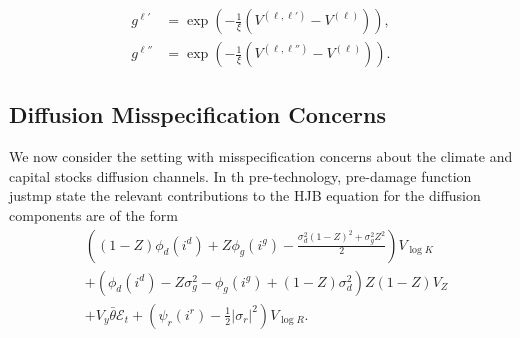 \documentclass[12pt]{article}
\begin{document}
\begin{appendices}
\vspace{-0.75cm}

\begin{eqnarray*} 
g^{\ell'} & = \exp \left(- \frac{1}{\xi} (V^{(\ell,\ell')}-V^{(\ell)}) \right), \\
g^{\ell''} & = \exp \left(- \frac{1}{\xi} (V^{(\ell,\ell'')}-V^{(\ell)}) \right).
\end{eqnarray*}

\subsection{Diffusion Misspecification Concerns}

We now consider the setting with misspecification concerns about the climate and capital stocks diffusion channels. In th pre-technology, pre-damage function justmp state the relevant contributions to the HJB equation for the diffusion components are of the form
\begin{equation*}
\begin{split}
 & \left((1-Z) \phi_d(i^{d}) + Z \phi_g(i^{g}) -\frac{   \sigma_d^2 (1-Z)^2 + \sigma_g^2 Z^2 }{2} \right)V_{\log K} \\
 & +\left( \phi_d(i^{d}) - Z \sigma_g^2 - \phi_g(i^{g})  + (1-Z) \sigma_d^2  \right) Z (1-Z) V_{Z}\\
 & +  V_{y}  \bar{\theta} \mathcal{E}_t + \left(\psi_{r}(i^{r})-\frac{1}{2}|\sigma_{r}|^{2}  \right) V_{\log R}.  \\
\end{split}
\end{equation*}


\end{appendices}
\end{document}

